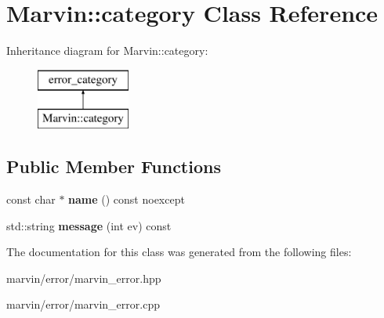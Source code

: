 \hypertarget{class_marvin_1_1category}{}\section{Marvin\+:\+:category Class Reference}
\label{class_marvin_1_1category}
Inheritance diagram for Marvin\+:\+:category\+:\begin{figure}[H]
\begin{center}
\leavevmode
\includegraphics[height=2.000000cm]{class_marvin_1_1category}
\end{center}
\end{figure}
\subsection*{Public Member Functions}
\begin{DoxyCompactItemize}
\item 
\mbox{\label{class_marvin_1_1category_ae34f37940b43cfc4e423549177c811e7}} 
const char $\ast$ {\bfseries name} () const noexcept
\item 
\mbox{\label{class_marvin_1_1category_a427051ac45bd66c690fd431a5e5846b7}} 
std\+::string {\bfseries message} (int ev) const
\end{DoxyCompactItemize}


The documentation for this class was generated from the following files\+:\begin{DoxyCompactItemize}
\item 
marvin/error/marvin\+\_\+error.\+hpp\item 
marvin/error/marvin\+\_\+error.\+cpp\end{DoxyCompactItemize}

